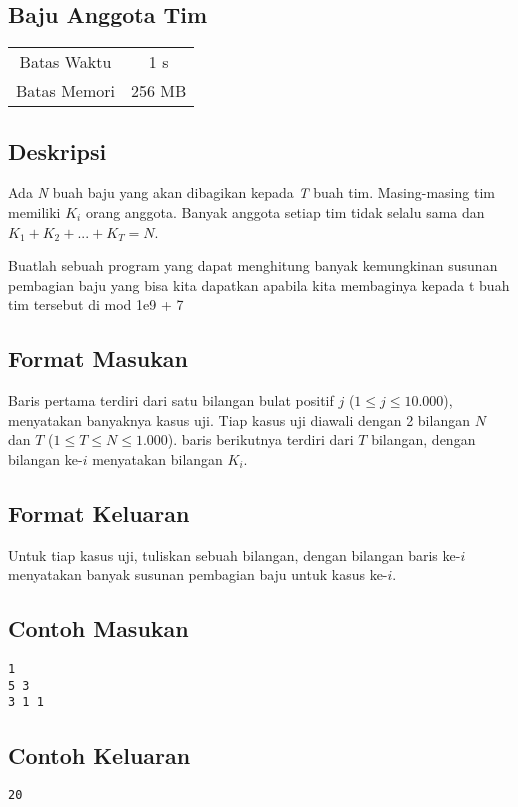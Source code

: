 \documentclass{article}
\begin{document}
\begin{center}

    
    \section*{Baju Anggota Tim} %

    \begin{tabular}{ | c c | }
        \hline
        Batas Waktu  & 1 s \\    %
        Batas Memori & 256 MB \\  %
        \hline
    \end{tabular}
\end{center}

\subsection*{Deskripsi}

Ada \textit{N} buah baju yang akan dibagikan kepada \textit{T} buah tim. Masing-masing tim memiliki $K_i$ orang anggota. Banyak anggota setiap tim tidak selalu sama dan $K_1 + K_2 + ... + K_T = N$.

Buatlah sebuah program yang dapat menghitung banyak kemungkinan susunan pembagian baju yang bisa kita dapatkan apabila kita membaginya kepada t buah tim tersebut di mod 1e9 + 7

\subsection*{Format Masukan}

Baris pertama terdiri dari satu bilangan bulat positif $j$ ($1 \leq j \leq 10.000$), menyatakan banyaknya kasus uji.
Tiap kasus uji diawali dengan 2 bilangan $N$ dan $T$ ($1 \leq T \leq N \leq  1.000$).
baris berikutnya terdiri dari $T$ bilangan, dengan bilangan ke-$i$ menyatakan bilangan $K_i$.

\subsection*{Format Keluaran}

Untuk tiap kasus uji, tuliskan sebuah bilangan, dengan bilangan baris ke-$i$ menyatakan banyak susunan pembagian baju untuk kasus ke-$i$.
\\

\begin{multicols}{2}
\subsection*{Contoh Masukan}
\begin{lstlisting}
1
5 3
3 1 1
\end{lstlisting}
\columnbreak
\subsection*{Contoh Keluaran}
\begin{lstlisting}
20
\end{lstlisting}
\vfill
\null
\end{multicols}

\pagebreak
\end{document}
